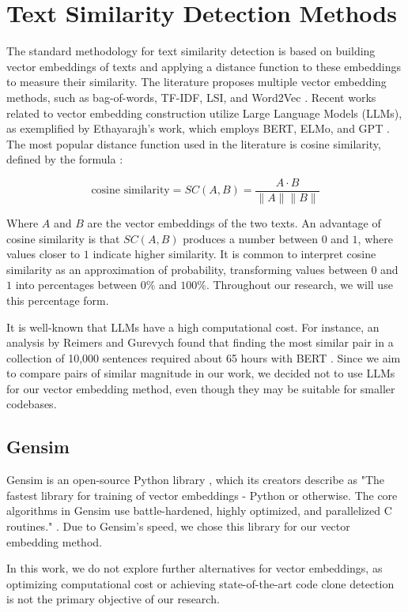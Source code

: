 \en

\section{Text Similarity Detection Methods}
\label{sec:similarity}

The standard methodology for text similarity detection is based on building
vector embeddings of texts and applying a distance function to these embeddings
to measure their similarity. The literature proposes multiple vector
embedding methods, such as bag-of-words, TF-IDF, LSI, and Word2Vec
\citep{gensimlivro}. Recent works related to vector embedding construction
utilize Large Language Models (LLMs), as exemplified by Ethayarajh's work,
which employs BERT, ELMo, and GPT \citep{llmsimilar}. The most popular distance
function used in the literature is cosine similarity, defined by the formula
\citep{cosineref}:

$$\text{cosine similarity} = SC(A,B) = \frac{ A \cdot B}{ \lVert A \rVert \lVert B \rVert }$$

Where $A$ and $B$ are the vector embeddings of the two texts. An advantage of
cosine similarity is that $SC(A,B)$ produces a number between $0$ and $1$,
where values closer to $1$ indicate higher similarity. It is common to
interpret cosine similarity as an approximation of probability, transforming
values between $0$ and $1$ into percentages between $0\%$ and $100\%$.
Throughout our research, we will use this percentage form.

It is well-known that LLMs have a high computational cost. For instance, an
analysis by Reimers and Gurevych found that finding the most similar pair in a
collection of 10,000 sentences required about 65 hours with BERT
\citep{bertsimilar}. Since we aim to compare pairs of similar magnitude in
our work, we decided not to use LLMs for our vector embedding method, even
though they may be suitable for smaller codebases.

\subsection{Gensim}

Gensim is an open-source Python library \citep{gensim}, which its creators
describe as "The fastest library for training of vector embeddings - Python or
otherwise. The core algorithms in Gensim use battle-hardened, highly optimized,
and parallelized C routines." \citep{gensimsite}. Due to Gensim's speed, we
chose this library for our vector embedding method.

In this work, we do not explore further alternatives for vector embeddings, as
optimizing computational cost or achieving state-of-the-art code clone
detection is not the primary objective of our research.
